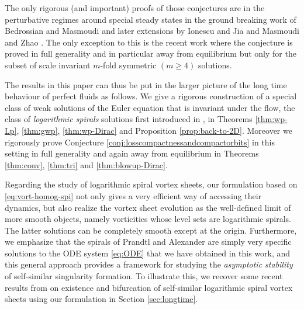 \documentclass[JEP,XML,SOM,Unicode,NoFloatCountersInSection,published]{cedram}
\theoremstyle{plain}
\theoremstyle{definition}
\begin{document}
The only rigorous (and important) proofs of those conjectures are in the perturbative regimes around special steady states in the ground breaking work of Bedrossian and Masmoudi \cite{BedrossianMasmoudi} and later extensions by Ionescu and Jia \cite{IonescuJia1,IonescuJia2} and Masmoudi and Zhao \cite{MasmoudiZhao}. The only exception to this is the recent work \cite{EMS} where the conjecture is proved in full generality and in particular away from equilibrium but only for the subset of scale invariant $m$-fold symmetric $(m\geq4)$ solutions.

The results in this paper can thus be put in the larger picture of the long time behaviour of perfect fluids as follows. We give a rigorous construction of a special class of weak solutions of the Euler equation that is invariant under the flow, the class of \textit{logarithmic spirals} solutions first introduced in \cite{EJSVP1}, in Theorems \ref{thm:wp-Lp}, \ref{thm:gwp}, \ref{thm:wp-Dirac} and Proposition \ref{prop:back-to-2D}. Moreover we rigorously prove Conjecture \ref{conj:losscompactnessandcompactorbits} in this setting in full generality and again away from equilibrium in Theorems \ref{thm:conv}, \ref{thm:tri} and \ref{thm:blowup-Dirac}.

Regarding the study of logarithmic spiral vortex sheets, our formulation based on \eqref{eq:vort-homog-spi} not only gives a very efficient way of accessing their dynamics, but also realize the vortex sheet evolution as the well-defined limit of more smooth objects, namely vorticities whose level sets are logarithmic spirals. The latter solutions can be completely smooth except at the origin. Furthermore, we emphasize that the spirals of Prandtl and Alexander are simply very specific solutions to the ODE system \eqref{eq:ODE} that we have obtained in this work, and this general approach provides a framework for studying the \textit{asymptotic stability} of self-similar singularity formation. To illustrate this, we recover some recent results from \cite{Elling-Gnann,CKW21,CKW22} on existence and bifurcation of self-similar logarithmic spiral vortex sheets using our formulation in Section \ref{sec:longtime}.
\end{document}
